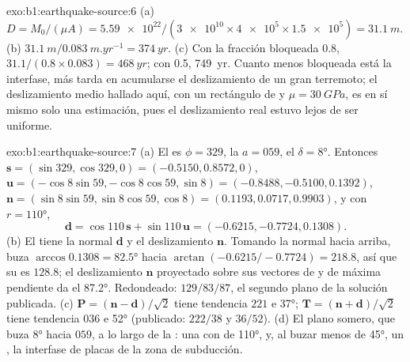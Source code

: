 \begin{solution}{exo:b1:earthquake-source:6}
(a) $D = M_0/(\mu A) = \num{5.59e22}/(\num{3e10}\times\num{4e5}\times\num{1.5e5})
= \qty{31.1}{m}$. (b) $\qty{31.1}{m}/\qty{0.083}{m.yr^{-1}} = \qty{374}{yr}$.
(c) Con la fracción bloqueada 0.8, $31.1/(0.8\times0.083) = \qty{468}{yr}$; con
0.5, \qty{749}{yr}. Cuanto menos bloqueada está la interfase, más tarda en acumularse
el deslizamiento de un gran terremoto; el deslizamiento medio hallado aquí, con un
rectángulo de  y $\mu = \qty{30}{GPa}$, es en sí mismo
solo una estimación, pues el deslizamiento real estuvo lejos de ser uniforme.
\end{solution}

\begin{solution}{exo:b1:earthquake-source:7}
(a) El  es $\phi = 329$, la  $a = 059$, el  $\delta =
\ang{8}$. Entonces $\mathbf s = (\sin329, \cos329, 0) = (-0.5150, 0.8572, 0)$,
$\mathbf u = (-\cos8\sin59, -\cos8\cos59, \sin8) = (-0.8488, -0.5100, 0.1392)$,
$\mathbf n = (\sin8\sin59, \sin8\cos59, \cos8) = (0.1193, 0.0717, 0.9903)$,
y con $r = \ang{110}$,
\[
  \mathbf d = \cos110\,\mathbf s + \sin110\,\mathbf u = (-0.6215, -0.7724, 0.1308) .
\]
(b) El  tiene la normal $\mathbf d$ y el deslizamiento $\mathbf n$.
Tomando la normal hacia arriba, buza $\arccos 0.1308 = \ang{82.5}$ hacia
$\arctan(-0.6215/-0.7724) = 218.8$, así que su  es $128.8$; el deslizamiento
$\mathbf n$ proyectado sobre sus vectores de  y de máxima pendiente da el 
\ang{87.2}. Redondeado: $129/83/87$, el segundo plano de la solución publicada.
(c) $\mathbf P = (\mathbf n - \mathbf d)/\sqrt2$ tiene tendencia $221$ e 
\ang{37}; $\mathbf T = (\mathbf n + \mathbf d)/\sqrt2$ tiene tendencia $036$ e 
\ang{52} (publicado: $222/38$ y $36/52$). (d) El plano somero, que buza \ang{8} hacia $059$, a lo largo de la
: una  con 
de \ang{110}, y, al buzar menos de \ang{45}, un , la interfase de placas
de la zona de subducción.
\end{solution}

